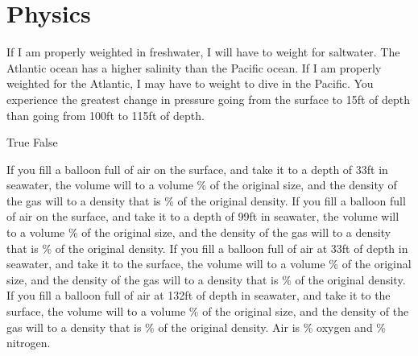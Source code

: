 \documentclass[12pt,letter]{exam}
\begin{document}
\begin{questions}
\begin{solution}
    \end{solution}
\section{Physics}
    \question If I am properly weighted in freshwater, I will have to \fillin[add] weight for saltwater.
    \question The Atlantic ocean has a higher salinity than the Pacific ocean. If I am properly weighted for the Atlantic, I may have to \fillin[remove] weight to dive in the Pacific.
    \question You experience the greatest change in pressure going from the surface to 15ft of depth than going from 100ft to 115ft of depth.
    \begin{oneparcheckboxes}
        \CorrectChoice True
        \choice False
    \end{oneparcheckboxes}
    \question If you fill a balloon full of air on the surface, and take it to a depth of 33ft in seawater, the volume will \fillin[decrease] to a volume \fillin[50]\% of the original size, and the density of the gas will \fillin[increase] to a density that is \fillin[200]\% of the original density.
    \question If you fill a balloon full of air on the surface, and take it to a depth of 99ft in seawater, the volume will \fillin[decrease] to a volume \fillin[25]\% of the original size, and the density of the gas will \fillin[increase] to a density that is \fillin[400]\% of the original density.
    \question If you fill a balloon full of air at 33ft of depth in seawater, and take it to the surface, the volume will \fillin[increase] to a volume \fillin[200]\% of the original size, and the density of the gas will \fillin[decrease] to a density that is \fillin[50]\% of the original density.
    \question If you fill a balloon full of air at 132ft of depth in seawater, and take it to the surface, the volume will \fillin[increase] to a volume \fillin[500]\% of the original size, and the density of the gas will \fillin[decrease] to a density that is \fillin[20]\% of the original density.
    \question Air is \fillin[21]\% oxygen and \fillin[79]\% nitrogen.

\end{questions}
\end{document}
